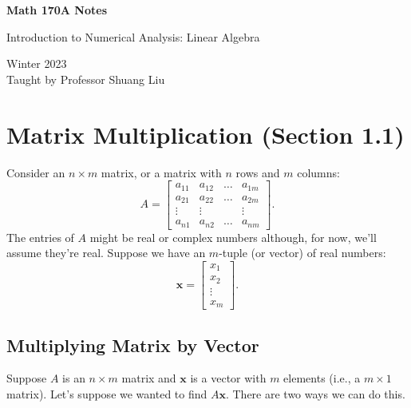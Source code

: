 \documentclass[letterpaper]{article}
\newcommand{\0}{\mathbf{0}}
\begin{document}
\begin{titlepage}
    \begin{center}
        \vspace*{1cm}
            
        \Huge
        \textbf{Math 170A Notes}
            
        \vspace{0.5cm}
        \LARGE
        Introduction to Numerical Analysis: Linear Algebra
            
        \vspace{1.5cm}
            
        \vfill
            
        Winter 2023\\
        Taught by Professor Shuang Liu
    \end{center}
\end{titlepage}


\newpage 

\begingroup
    \renewcommand\contentsname{Table of Contents}
    \tableofcontents
\endgroup

\newpage
{}

\section{Matrix Multiplication (Section 1.1)}
Consider an $n \times m$ matrix, or a matrix with $n$ rows and $m$ columns:
\[
    A = \begin{bmatrix}
        a_{11} & a_{12} & \hdots & a_{1m} \\ 
        a_{21} & a_{22} & \hdots & a_{2m} \\ 
        \vdots & \vdots &        & \vdots \\ 
        a_{n1} & a_{n2} & \hdots & a_{nm}
    \end{bmatrix}.
\]
The entries of $A$ might be real or complex numbers although, for now, we'll assume they're real. Suppose we have an $m$-tuple (or vector) of real numbers: 
\[\mathbf{x} = \begin{bmatrix}
    x_1 \\ x_2 \\ \vdots \\ x_m
\end{bmatrix}.\]

\subsection{Multiplying Matrix by Vector}
Suppose $A$ is an $n \times \boxed{m}$ matrix and $\mathbf{x}$ is a vector with $m$ elements (i.e., a $\boxed{m} \times 1$ matrix). Let's suppose we wanted to find $A\mathbf{x}$. There are two ways we can do this. 
\end{document}
